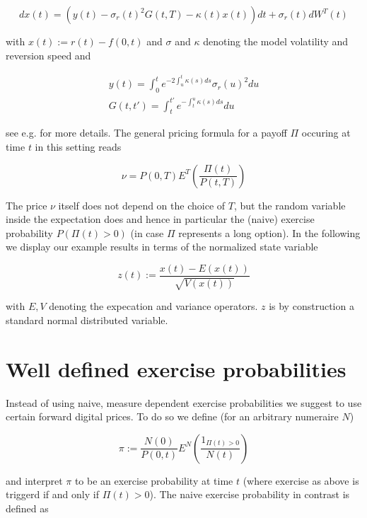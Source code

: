 \documentclass{amsart}
\theoremstyle{plain}
\numberwithin{equation}{section}
\begin{document}
\begin{equation}\label{hwdyn}
dx(t) = (y(t)-\sigma_r(t)^2G(t,T)-\kappa(t)x(t))dt+\sigma_r(t)dW^T(t)
\end{equation}

with $x(t) := r(t) - f(0,t)$ and $\sigma$ and $\kappa$ denoting the model volatility and reversion speed and

\begin{eqnarray}
y(t) = \int_0^t e^{-2 \int_u^t \kappa(s) ds} \sigma_r(u)^2 du \\
G(t,t') = \int_t^{t'} e^{-\int_t^u\kappa(s)ds} du
\end{eqnarray}

see e.g. \cite{piterbarg} for more details. The general pricing formula for a payoff $\Pi$ occuring at time $t$ in this setting reads

\begin{equation}
\nu = P(0,T) E^T \left( \frac{\Pi(t)}{P(t,T)} \right)
\end{equation}

The price $\nu$ itself does not depend on the choice of $T$, but the random variable inside the expectation does and hence 
in particular the (naive) exercise probability $P(\Pi(t) > 0 )$ (in case $\Pi$ represents a long option). In the following we display our example results in terms of the normalized state
variable

\begin{equation}
z(t) := \frac{x(t) - E(x(t))}{\sqrt{V(x(t))}}
\end{equation}

with $E, V$ denoting the expecation and variance operators. $z$ is by construction a standard normal distributed variable.

\section{Well defined exercise probabilities}

Instead of using naive, measure dependent exercise probabilities we suggest to use certain forward digital prices. To do so we define (for an arbitrary numeraire $N$)

\begin{equation}\label{defpi}
\pi := \frac{N(0)}{P(0,t)} E^N \left( \frac{1_{\Pi(t)>0}}{N(t)} \right)
\end{equation}

and interpret $\pi$ to be an exercise probability at time $t$ (where exercise as above is triggerd if and only if $\Pi(t)>0$). The naive exercise probability in contrast is defined as
\end{document}
